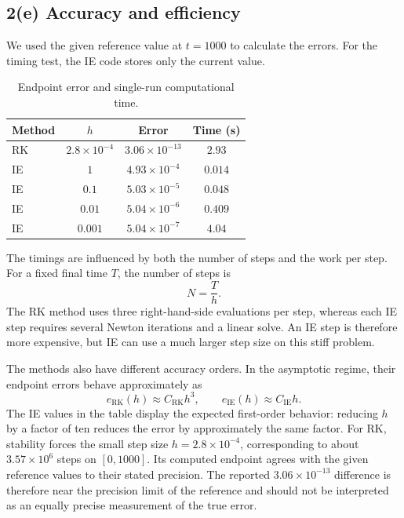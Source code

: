 \FloatBarrier
\subsection*{2(e) Accuracy and efficiency}
{}

We used the given reference value at $t=1000$ to calculate the errors. For the
timing test, the IE code stores only the current value.

\begin{table}[htbp]
\centering
\caption{Endpoint error and single-run computational time.}
\begin{tabular}{@{}lccc@{}}
\toprule
Method & $h$ & Error & Time (s)\\
\midrule
RK & $2.8\times10^{-4}$ & $3.06\times10^{-13}$ & $2.93$\\
IE & $1$ & $4.93\times10^{-4}$ & $0.014$\\
IE & $0.1$ & $5.03\times10^{-5}$ & $0.048$\\
IE & $0.01$ & $5.04\times10^{-6}$ & $0.409$\\
IE & $0.001$ & $5.04\times10^{-7}$ & $4.04$\\
\bottomrule
\end{tabular}
\end{table}

The timings are influenced by both the number of steps and the work per step.
For a fixed final time $T$, the number of steps is
\[
 N=\frac{T}{h}.
\]
The RK method uses three right-hand-side evaluations per step, whereas each IE
step requires several Newton iterations and a linear solve. An IE step is
therefore more expensive, but IE can use a much larger step size on this stiff
problem.

The methods also have different accuracy orders. In the asymptotic regime,
their endpoint errors behave approximately as
\[
 e_{\mathrm{RK}}(h)\approx C_{\mathrm{RK}}h^3,
 \qquad
 e_{\mathrm{IE}}(h)\approx C_{\mathrm{IE}}h.
\]
The IE values in the table display the expected first-order behavior: reducing
$h$ by a factor of ten reduces the error by approximately the same factor. For
RK, stability forces the small step size $h=2.8\times10^{-4}$, corresponding to
about $3.57\times10^6$ steps on $[0,1000]$. Its computed endpoint agrees with the
given reference values to their stated precision. The reported
$3.06\times10^{-13}$ difference is therefore near the precision limit of the
reference and should not be interpreted as an equally precise measurement of
the true error.

